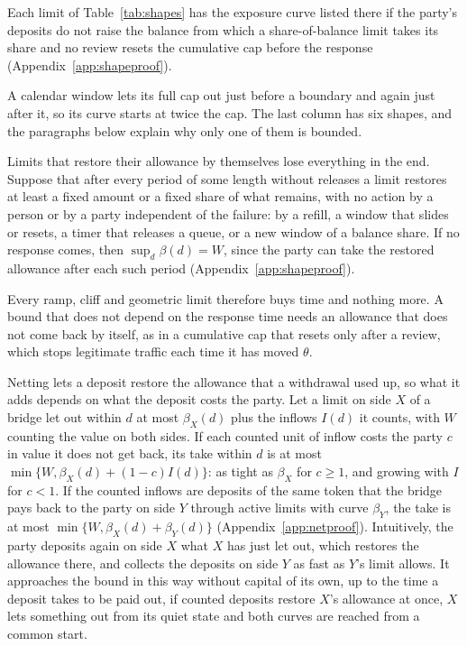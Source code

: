 \documentclass[conference,compsoc]{IEEEtran}
\numberwithin{equation}{section}
\theoremstyle{plain}
\theoremstyle{definition}
\theoremstyle{remark}
\begin{document}
Each limit of Table~\ref{tab:shapes} has the exposure curve listed there if the party's deposits do not raise the balance from which a share-of-balance limit takes its share and no review resets the cumulative cap before the response (Appendix~\ref{app:shapeproof}).

A calendar window lets its full cap out just before a boundary and again just after it, so its curve starts at twice the cap. The last column has six shapes, and the paragraphs below explain why only one of them is bounded.

Limits that restore their allowance by themselves lose everything in the end. Suppose that after every period of some length without releases a limit restores at least a fixed amount or a fixed share of what remains, with no action by a person or by a party independent of the failure: by a refill, a window that slides or resets, a timer that releases a queue, or a new window of a balance share. If no response comes, then $\sup_d \beta(d) = W$, since the party can take the restored allowance after each such period (Appendix~\ref{app:shapeproof}).

Every ramp, cliff and geometric limit therefore buys time and nothing more. A bound that does not depend on the response time needs an allowance that does not come back by itself, as in a cumulative cap that resets only after a review, which stops legitimate traffic each time it has moved $\theta$.

Netting lets a deposit restore the allowance that a withdrawal used up, so what it adds depends on what the deposit costs the party. Let a limit on side $X$ of a bridge let out within $d$ at most $\beta_X(d)$ plus the inflows $I(d)$ it counts, with $W$ counting the value on both sides. If each counted unit of inflow costs the party $c$ in value it does not get back, its take within $d$ is at most $\min\{W, \beta_X(d) + (1-c) I(d)\}$: as tight as $\beta_X$ for $c \ge 1$, and growing with $I$ for $c < 1$. If the counted inflows are deposits of the same token that the bridge pays back to the party on side $Y$ through active limits with curve $\beta_Y$, the take is at most $\min\{W, \beta_X(d) + \beta_Y(d)\}$ (Appendix~\ref{app:netproof}). Intuitively, the party deposits again on side $X$ what $X$ has just let out, which restores the allowance there, and collects the deposits on side $Y$ as fast as $Y$'s limit allows. It approaches the bound in this way without capital of its own, up to the time a deposit takes to be paid out, if counted deposits restore $X$'s allowance at once, $X$ lets something out from its quiet state and both curves are reached from a common start.
\end{document}
